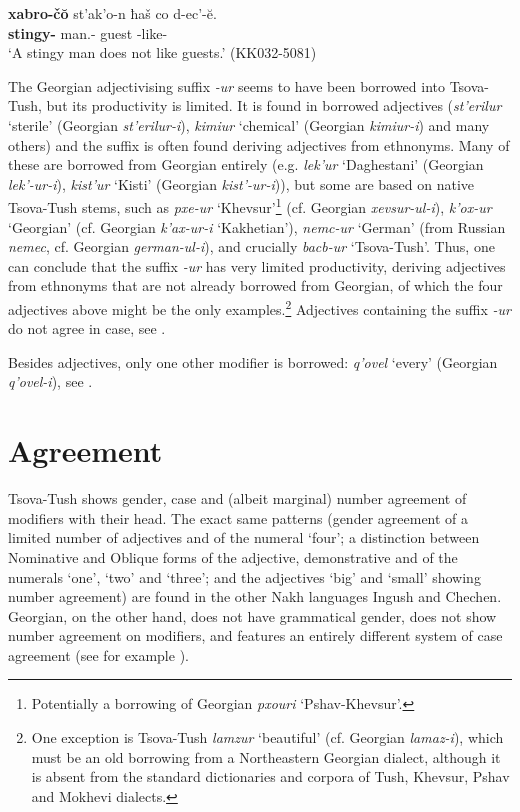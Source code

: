 \begin{exe}
	\ex\label{simplenp-ex54}
	\gll \textbf{xabro-č\u{o}} st'ak'o-n ħaš co d-ec'-\u{e}. \\
	\textbf{stingy-{\Obl}} man.{\Obl}-{\Dat} guest {\Neg} {\D}-like-{\Npst}\\
	\trans `A stingy man does not like guests.'
	\hfill (KK032-5081)
\end{exe}


The Georgian adjectivising suffix \textit{-ur} seems to have been borrowed into Tsova-Tush, but its productivity is limited. It is found in borrowed adjectives (\textit{st'erilur} `sterile' (Georgian \textit{st'erilur-i}), \textit{kimiur} `chemical' (Georgian \textit{kimiur-i}) and many others) and the suffix is often found deriving adjectives from ethnonyms. Many of these are borrowed from Georgian entirely (e.g. \textit{lek'ur} `Daghestani' (Georgian \textit{lek'-ur-i}), \textit{kist'ur} `Kisti' (Georgian \textit{kist'-ur-i})), but some are based on native Tsova-Tush stems, such as \textit{pxe-ur} `Khevsur'\footnote{Potentially a borrowing of Georgian \textit{pxouri} `Pshav-Khevsur'.} (cf. Georgian \textit{xevsur-ul-i}), \textit{k'ox-ur} `Georgian' (cf. Georgian \textit{k'ax-ur-i} `Kakhetian'), \textit{nemc-ur} `German' (from Russian \textit{nemec}, cf. Georgian \textit{german-ul-i}), and crucially \textit{bacb-ur} `Tsova-Tush'. Thus, one can conclude that the suffix \textit{-ur} has very limited productivity, deriving adjectives from ethnonyms that are not already borrowed from Georgian, of which the four adjectives above might be the only examples.\footnote{One exception is Tsova-Tush \textit{lamzur} `beautiful' (cf. Georgian \textit{lamaz-i}), which must be an old borrowing from a Northeastern Georgian dialect, although it is absent from the standard dictionaries and corpora of Tush, Khevsur, Pshav and Mokhevi dialects.} Adjectives containing the suffix \textit{-ur} do not agree in case, see .

Besides adjectives, only one other modifier is borrowed: \textit{q'ovel} `every' (Georgian \textit{q'ovel-i}), see .


\section{Agreement} \label{agreement}

Tsova-Tush shows gender, case and (albeit marginal) number agreement of modifiers with their head. The exact same patterns (gender agreement of a limited number of adjectives and of the numeral `four'; a distinction between Nominative and Oblique forms of the adjective, demonstrative and of the numerals `one', `two' and `three'; and the adjectives `big' and `small' showing number agreement) are found in the other Nakh languages Ingush and Chechen. Georgian, on the other hand, does not have grammatical gender, does not show number agreement on modifiers, and features an entirely different system of case agreement (see for example \cite[45--60]{hewitt95}).


